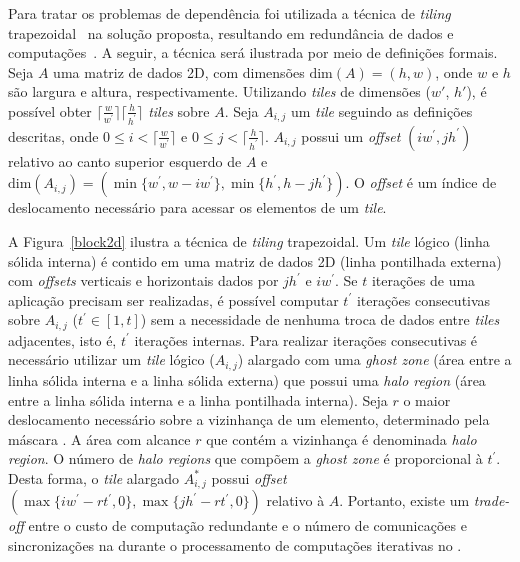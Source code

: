 Para tratar os problemas de dependência foi utilizada a técnica de
\textit{tiling} trapezoidal~\cite{meng11} na solução proposta, resultando em redundância de
dados e computações~\cite{Rocha:2017}. A seguir, a técnica será ilustrada
por meio de definições formais. Seja $A$ uma matriz de dados 2D, com dimensões
$\textrm{dim}(A) = (h,w)$, onde $w$ e $h$ são largura e altura, respectivamente.
Utilizando \textit{tiles} de dimensões ($w'$, $h'$), é possível obter
$\lceil\frac{w}{w^\prime}\rceil\lceil\frac{h}{h^\prime}\rceil$ \textit{tiles}
sobre $A$. Seja $A_{i,j}$ um \textit{tile} seguindo as definições descritas,
onde $0 \leq i < \lceil\frac{w}{w^\prime}\rceil$ e $0\leq j <
\lceil\frac{h}{h^\prime}\rceil$. $A_{i,j}$ possui um \textit{offset} $(i
w^\prime, j h^\prime)$ relativo ao canto superior esquerdo de $A$ e
$\textrm{dim}(A_{i,j}) = (\min\{w^\prime, w-i w^\prime\}, \min\{h^\prime, h-j
h^\prime\})$. O \textit{offset} é um índice de deslocamento necessário para
acessar os elementos de um \textit{tile}.

A Figura~\ref{block2d} ilustra a técnica de \textit{tiling} trapezoidal. Um
\textit{tile} lógico (linha sólida interna) é contido em uma matriz de dados 2D
(linha pontilhada externa) com \textit{offsets} verticais e horizontais dados
por $jh^\prime$ e $iw^\prime$. Se $t$ iterações de uma aplicação \stencil
precisam ser realizadas, é possível computar $t^\prime$ iterações consecutivas
sobre $A_{i,j}$ ($t^\prime \in \left[1,t\right]$) sem a necessidade de nenhuma
troca de dados entre \textit{tiles} adjacentes, isto é, $t^\prime$ iterações
internas. Para realizar iterações consecutivas é necessário utilizar um
\textit{tile} lógico ($A_{i,j}$) alargado com uma \textit{ghost zone} (área
entre a linha sólida interna e a linha sólida externa) que possui uma
\textit{halo region} (área entre a linha sólida interna e a linha pontilhada
interna). Seja $r$ o maior deslocamento necessário sobre a vizinhança de um
elemento, determinado pela máscara \stencil. A área com alcance $r$ que contém a
vizinhança é denominada \textit{halo region}. O número de \textit{halo regions}
que compõem a \textit{ghost zone} é proporcional à $t^\prime$. Desta forma, o
\textit{tile} alargado $A^\ast_{i,j}$ possui \textit{offset} $(\max\{iw^\prime -
rt^\prime, 0\}, \max\{jh^\prime - rt^\prime, 0\})$ relativo à $A$. Portanto,
existe um \textit{trade-off} entre o custo de computação redundante e o número
de comunicações e sincronizações na \noc durante o processamento de computações
\stencil iterativas no \mppa.

